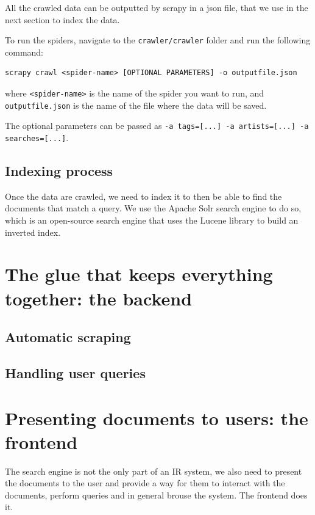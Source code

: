 \documentclass[tikz,14pt]{article}
\begin{document}
All the crawled data can be outputted by scrapy in a json file, that we use in the next section to index the data.

To run the spiders, navigate to the \texttt{crawler/crawler} folder and run the following command:
\begin{verbatim}
scrapy crawl <spider-name> [OPTIONAL PARAMETERS] -o outputfile.json
\end{verbatim}
where \texttt{<spider-name>} is the name of the spider you want to run,
and \texttt{outputfile.json} is the name of the file where the data will be saved.

The optional parameters can be passed as \texttt{-a tags=[...] -a artists=[...] -a searches=[...]}.



\subsection{Indexing process} \label{sec:indexing}
Once the data are crawled, we need to index it to then be able to find the documents that match a query.
We use the Apache Solr search engine to do so, which is an open-source search engine that uses the Lucene library to build an inverted index.
 
\section{The glue that keeps everything together: the backend} \label{sec:backend}
\subsection{Automatic scraping} \label{sec:scraping}
\subsection{Handling user queries} \label{sec:queries}






\section{Presenting documents to users: the frontend} \label{sec:frontend}
The search engine is not the only part of an IR system, we also need to present the documents to the user and 
provide a way for them to interact with the documents, perform queries and in general brouse the system.
The frontend does it.
\end{document}
